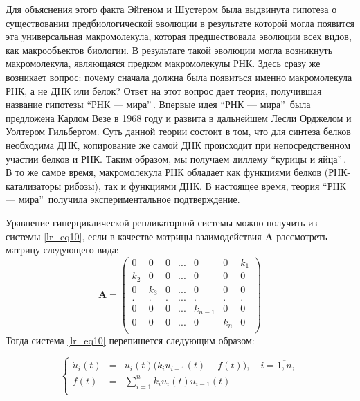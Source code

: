 Для объяснения этого факта Эйгеном и Шустером была выдвинута гипотеза о существовании предбиологической эволюции в результате которой могла появится эта универсальная макромолекула, которая предшествовала эволюции всех видов, как макрообъектов биологии. В результате такой эволюции могла возникнуть макромолекула, являющаяся предком макромолекулы РНК. Здесь сразу же возникает вопрос: почему сначала должна была появиться именно макромолекула РНК, а не ДНК или белок? Ответ на этот вопрос дает теория, получившая название гипотезы ``РНК --- мира''\,. Впервые идея ``РНК --- мира''\, была предложена Карлом Везе в 1968 году и развита в дальнейшем Лесли Орджелом и Уолтером Гильбертом. Суть данной теории состоит в том, что для синтеза белков необходима ДНК, копирование же самой ДНК происходит при непосредственном участии белков и РНК. Таким образом, мы получаем диллему ``курицы и яйца''\,. В то же самое время, макромолекула РНК обладает как функциями белков (РНК-катализаторы рибозы), так и функциями ДНК. В настоящее время, теория ``РНК --- мира''\, получила экспериментальное подтверждение.

Уравнение гиперциклической репликаторной системы можно получить из системы \eqref{lr_eq10}, если в качестве матрицы взаимодействия $\mathbf{A}$ рассмотреть матрицу следующего вида:
$$
\mathbf{A} = 
\begin{pmatrix}
0 & 0 & 0 & ... & 0 & 0 & k_{1}\\
k_{2} & 0 & 0 & ... & 0 & 0 & 0\\
0 & k_{3} & 0 & ... & 0 & 0 & 0\\
. & . & . & ... & . & . & .\\
0 & 0 & 0 & ... & k_{n - 1} & 0 & 0\\
0 & 0 & 0 & ... & 0& k_{n} & 0\\
\end{pmatrix}
$$
Тогда система \eqref{lr_eq10} перепишется следующим образом:

\begin{equation}
\left\{
\begin{array}{rcl}
\dot{u}_{i}(t) &=& u_{i}(t)\Big(k_{i}u_{i- 1}(t) - f(t)\Big), \quad i = \overline{1, n},\\
f(t) &=& \sum\limits_{i = 1}^{n}k_{i}u_{i}(t)u_{i - 1}(t)\\
\end{array}
\right.
\label{lr_eq12}
\end{equation}  

